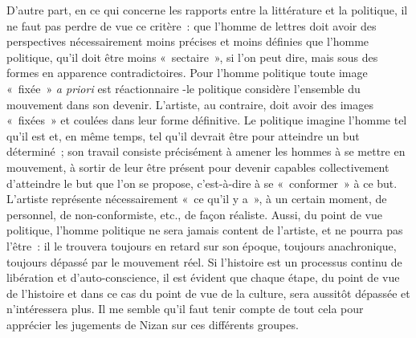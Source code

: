\documentclass[french,twoside]{book} %
\begin{document}
D'autre part, en ce qui concerne les rapports entre la littérature et la politique, il ne faut pas perdre de vue ce critère : que l’homme de lettres doit avoir des perspectives nécessairement moins précises et moins définies que l’homme politique, qu’il doit être moins « sectaire », si l’on peut dire, mais sous des formes en apparence contradictoires. Pour l’homme politique toute image « fixée » \emph{a priori} est réactionnaire -le politique considère l’ensemble du mouvement dans son devenir. L'artiste, au contraire, doit avoir des images « fixées » et coulées dans leur forme définitive. Le politique imagine l’homme tel qu’il est et, en même temps, tel qu’il devrait être pour atteindre un but déterminé ; son travail consiste précisément à amener les hommes à se mettre en mouvement, à sortir de leur être présent pour devenir capables collectivement d’atteindre le but que l’on se propose, c’est-à-dire à se « conformer » à ce but. L'artiste représente nécessairement « ce qu’il y a », à un certain moment, de personnel, de non-conformiste, etc., de façon réaliste. Aussi, du point de vue politique, l’homme politique ne sera jamais content de l’artiste, et ne pourra pas l’être : il le trouvera toujours en retard sur son époque, toujours anachronique, toujours dépassé par le mouvement réel. Si l’histoire est un processus continu de libération et d’auto-conscience, il est évident que chaque étape, du point de vue de l’histoire et dans ce cas du point de vue de la culture, sera aussitôt dépassée et n’intéressera plus. Il me semble qu’il faut tenir compte de tout cela pour apprécier les jugements de Nizan sur ces différents groupes.\par
\end{document}
